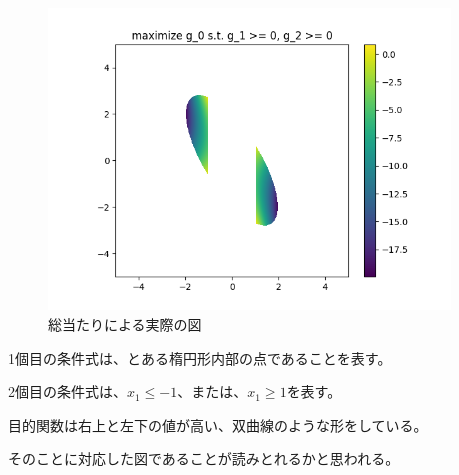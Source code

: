 \documentclass[a4paper, 10pt, dvipdfmx]{jlreq}
\begin{document}
\begin{figure}[htbp]
  \begin{center}
    \includegraphics[height=80mm]{4_actual.png}
    \caption{総当たりによる実際の図}
    \label{img:label}
  \end{center}
\end{figure}

1個目の条件式は、とある楕円形内部の点であることを表す。

2個目の条件式は、$x_1 \leq -1$、または、$x_1 \geq 1$を表す。

目的関数は右上と左下の値が高い、双曲線のような形をしている。

そのことに対応した図であることが読みとれるかと思われる。
\end{document}
